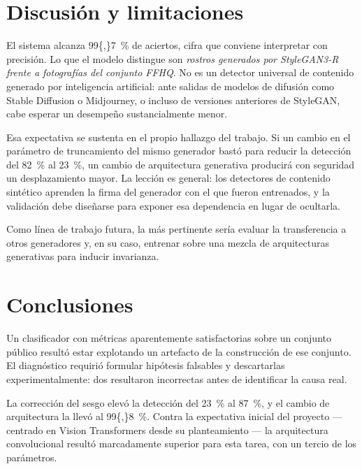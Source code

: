 \documentclass[10pt,twocolumn,letterpaper]{article}
\begin{document}
\section{Discusión y limitaciones}

El sistema alcanza \SI{99{,}7}{\percent} de aciertos, cifra que conviene
interpretar con precisión. Lo que el modelo distingue son \emph{rostros
generados por StyleGAN3-R frente a fotografías del conjunto FFHQ}. No es un
detector universal de contenido generado por inteligencia artificial: ante
salidas de modelos de difusión como Stable Diffusion o Midjourney, o incluso
de versiones anteriores de StyleGAN, cabe esperar un desempeño
sustancialmente menor.

Esa expectativa se sustenta en el propio hallazgo del trabajo. Si un cambio
en el parámetro de truncamiento del mismo generador bastó para reducir la
detección del \SI{82}{\percent} al \SI{23}{\percent}, un cambio de
arquitectura generativa producirá con seguridad un desplazamiento mayor. La
lección es general: los detectores de contenido sintético aprenden la firma
del generador con el que fueron entrenados, y la validación debe diseñarse
para exponer esa dependencia en lugar de ocultarla.

Como línea de trabajo futura, la más pertinente sería evaluar la
transferencia a otros generadores y, en su caso, entrenar sobre una mezcla
de arquitecturas generativas para inducir invarianza.

\section{Conclusiones}

Un clasificador con métricas aparentemente satisfactorias sobre un conjunto
público resultó estar explotando un artefacto de la construcción de ese
conjunto. El diagnóstico requirió formular hipótesis falsables y
descartarlas experimentalmente: dos resultaron incorrectas antes de
identificar la causa real.

La corrección del sesgo elevó la detección del \SI{23}{\percent} al
\SI{87}{\percent}, y el cambio de arquitectura la llevó al
\SI{99{,}8}{\percent}. Contra la expectativa inicial del proyecto ---
centrado en Vision Transformers desde su planteamiento --- la arquitectura
convolucional resultó marcadamente superior para esta tarea, con un tercio
de los parámetros.
\end{document}
